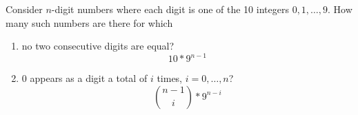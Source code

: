\item Consider $n$-digit numbers where each digit is one of the 10 integers $0,1,\dots,9$. How many such numbers are there for which
\begin{enumerate}
    \item no two consecutive digits are equal?
    \[ 10 * 9^{n-1} \]
    \item 0 appears as a digit a total of $i$ times, $i = 0,\dots,n$?
    \[ \binom{n-1}{i} * 9^{n-i} \]
\end{enumerate}